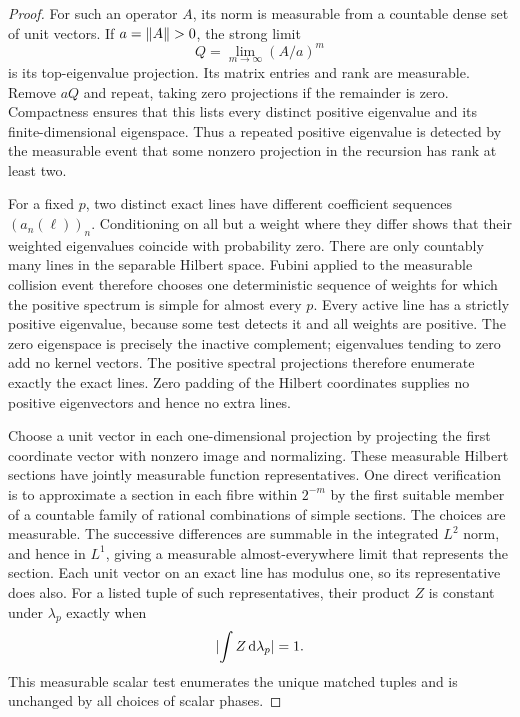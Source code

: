 \begin{proof}
For such an operator $A$, its norm is measurable from a countable
dense set of unit vectors. If $a=\lVert A\rVert>0$, the strong limit
\[
 Q=\lim_{m\to\infty}(A/a)^m
\]
is its top-eigenvalue projection. Its matrix entries and rank are
measurable. Remove $aQ$ and repeat, taking zero projections if the
remainder is zero. Compactness ensures that this lists every distinct
positive eigenvalue and its finite-dimensional eigenspace. Thus a
repeated positive eigenvalue is detected by the measurable event that
some nonzero projection in the recursion has rank at least two.

For a fixed $p$, two distinct exact lines have different coefficient
sequences $(a_n(\ell))_n$. Conditioning on all but a weight where they
differ shows that their weighted eigenvalues coincide with probability
zero. There are only countably many lines in the separable Hilbert
space. Fubini applied to the measurable collision event therefore
chooses one deterministic sequence of weights for which the positive
spectrum is simple for almost every $p$. Every active line has a
strictly positive eigenvalue, because some test detects it and all
weights are positive. The zero eigenspace is precisely the inactive
complement; eigenvalues tending to zero add no kernel vectors. The
positive spectral projections therefore enumerate exactly the exact
lines. Zero padding of the Hilbert coordinates supplies no positive
eigenvectors and hence no extra lines.

Choose a unit vector in each one-dimensional projection by projecting
the first coordinate vector with nonzero image and normalizing.
These measurable Hilbert sections have jointly measurable function
representatives. One direct verification is to approximate a section
in each fibre within $2^{-m}$ by the first suitable member of a
countable family of rational combinations of simple sections.
The choices are measurable. The successive differences are summable
in the integrated $L^2$ norm, and hence in $L^1$, giving a measurable
almost-everywhere limit that represents the section. Each unit vector
on an exact line has modulus one, so its representative does also.
For a listed tuple of such representatives, their product $Z$ is
constant under $\lambda_p$ exactly when
\begin{equation}\label{eq:exact-tuple-test}
 \lvert \int Z\,\mathrm d\lambda_p\rvert=1.
\end{equation}
This measurable scalar test enumerates the unique matched tuples and
is unchanged by all choices of scalar phases.


\end{proof}

